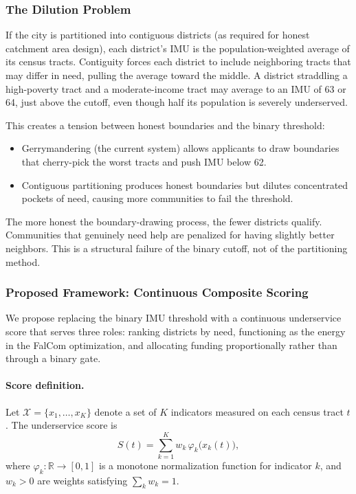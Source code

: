 \documentclass[11pt]{article}
\newcommand{\R}{\mathbb{R}}
\begin{document}
\subsubsection{The Dilution Problem}\label{sec:dilution}

If the city is partitioned into contiguous districts (as required for honest
catchment area design), each district's IMU is the population-weighted average
of its census tracts. Contiguity forces each district to include neighboring
tracts that may differ in need, pulling the average toward the middle. A
district straddling a high-poverty tract and a moderate-income tract may
average to an IMU of 63 or 64, just above the cutoff, even though half its
population is severely underserved.

This creates a tension between honest boundaries and the binary threshold:
\begin{itemize}
  \item Gerrymandering (the current system) allows applicants to draw
    boundaries that cherry-pick the worst tracts and push IMU below 62.
  \item Contiguous partitioning produces honest boundaries but dilutes
    concentrated pockets of need, causing more communities to fail the
    threshold.
\end{itemize}
The more honest the boundary-drawing process, the fewer districts qualify.
Communities that genuinely need help are penalized for having slightly better
neighbors. This is a structural failure of the binary cutoff, not of the
partitioning method.


\subsubsection{Proposed Framework: Continuous Composite Scoring}\label{sec:score-function}

We propose replacing the binary IMU threshold with a continuous underservice
score that serves three roles: ranking districts by need, functioning as the
energy in the FalCom optimization, and allocating funding proportionally rather
than through a binary gate.

\paragraph{Score definition.}
Let $\mathcal{X} = \{x_1, \ldots, x_K\}$ denote a set of $K$ indicators
measured on each census tract $t$. The underservice score is
\begin{equation}\label{eq:score}
  S(t) = \sum_{k=1}^{K} w_k \, \varphi_k\bigl(x_k(t)\bigr),
\end{equation}
where $\varphi_k : \R \to [0,1]$ is a monotone normalization function for
indicator $k$, and $w_k > 0$ are weights satisfying $\sum_k w_k = 1$.
\end{document}
